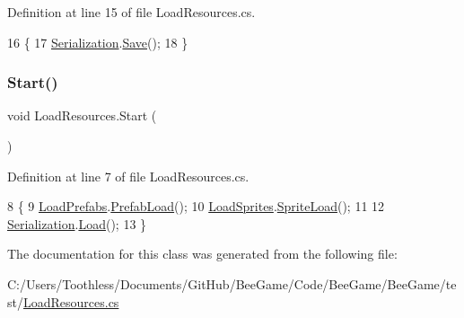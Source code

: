 Definition at line 15 of file Load\+Resources.\+cs.


\begin{DoxyCode}
16     \{
17         \hyperlink{class_bee_game_1_1_serialization_1_1_serialization}{Serialization}.\hyperlink{class_bee_game_1_1_serialization_1_1_serialization_ac1a39ee414803d84d970c1d6c03facbc}{Save}();
18     \}
\end{DoxyCode}
\mbox{\label{class_load_resources_ac4b32bb35a4c789b1b3fe3b5044001a9}} 
\subsubsection{\texorpdfstring{Start()}{Start()}}
{\footnotesize\ttfamily void Load\+Resources.\+Start (\begin{DoxyParamCaption}{ }\end{DoxyParamCaption})\hspace{0.3cm}{\ttfamily [private]}}



Definition at line 7 of file Load\+Resources.\+cs.


\begin{DoxyCode}
8     \{
9         \hyperlink{class_bee_game_1_1_core_1_1_load_prefabs}{LoadPrefabs}.\hyperlink{class_bee_game_1_1_core_1_1_load_prefabs_ae6045dba0f7f8bad5a1256ff46747614}{PrefabLoad}();
10         \hyperlink{class_bee_game_1_1_core_1_1_load_sprites}{LoadSprites}.\hyperlink{class_bee_game_1_1_core_1_1_load_sprites_a501313d9f5961420d4a9a0ede72f6907}{SpriteLoad}();
11 
12         \hyperlink{class_bee_game_1_1_serialization_1_1_serialization}{Serialization}.\hyperlink{class_bee_game_1_1_serialization_1_1_serialization_a08f39770d6cc2b4a86fd7d7f00ff56a7}{Load}();
13     \}
\end{DoxyCode}


The documentation for this class was generated from the following file\+:\begin{DoxyCompactItemize}
\item 
C\+:/\+Users/\+Toothless/\+Documents/\+Git\+Hub/\+Bee\+Game/\+Code/\+Bee\+Game/\+Bee\+Game/test/\hyperlink{_load_resources_8cs}{Load\+Resources.\+cs}\end{DoxyCompactItemize}
